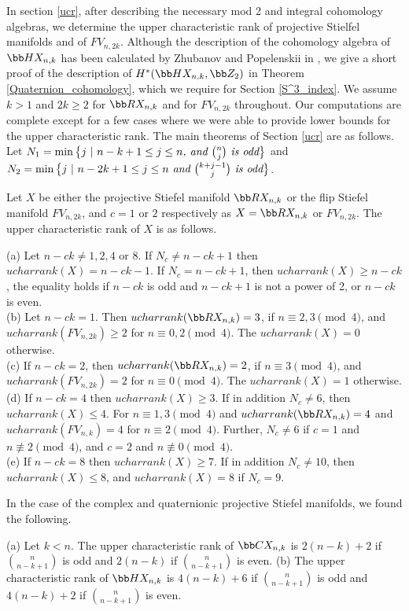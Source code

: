 In section \ref{ucr}, after describing the necessary mod 2 and integral cohomology algebras, we determine the upper characteristic rank of projective Stielfel manifolds and of $FV_{n, 2k}$. Although the description of the cohomology algebra of $\bb HX_{n, k}$ has been calculated by Zhubanov and Popelenskii in \cite{Zhu-Pop2022}, we give a short proof of the description of $H^*(\bb HX_{n,k}, \bb Z_2)$ in Theorem \ref{Quaternion_cohomology}, which we require for Section \ref{S^3_index}. We assume $k>1$ and $2k\geq 2$ for $\bb RX_{n,k}$ and for $FV_{n, 2k}$ throughout. Our computations are complete except for a few cases where we were able to provide lower bounds for the upper characteristic rank. The main theorems of Section \ref{ucr} are as follows. Let $N_1=\min\big{\{}j~|~n-k+1\leq j\leq n \textit{, and $\binom{n}{j}$ is odd}\big{\}}$ and $N_2= \min\big{\{}j~|~n-2k+1\leq j\leq n \textit{ and $\binom{k+j-1}{j}$ is odd}\big{\}}$.
\begin{Theorem}\label{main1}
    Let $X$ be either the projective Stiefel manifold $\bb RX_{n, k}$ or the flip Stiefel manifold $FV_{n, 2k}$, and $c=1$ or $2$ respectively as $X=\bb RX_{n, k}$ or $FV_{n, 2k}$. The upper characteristic rank of $X$ is as follows.
    
          (a) Let $n - ck\neq 1,2,4$ or $8$. If $N_c\neq n-ck+1$ then $ucharrank(X)= n-ck-1$. If $N_c=n-ck+1$, then $ucharrank(X)\geq n-ck$, the equality holds if $n-ck$ is odd and $n-ck+1$ is not a power of 2, or $n-ck$ is even. \\
          (b) Let $n - ck = 1$. Then $ucharrank(\bb RX_{n,k})=3$, if $n\equiv 2, 3\pmod 4$, and $ucharrank(FV_{n, 2k})\geq 2$ for $n\equiv 0,2\pmod 4$. The $ucharrank(X)= 0$ otherwise. \\
          (c) If $n-ck = 2$, then $ucharrank(\bb RX_{n,k})=2$, if $n\equiv 3\pmod 4$, and $ucharrank(FV_{n, 2k})= 2$ for $n\equiv 0\pmod 4$. The $ucharrank(X)= 1$ otherwise. \\
          (d) If $n-ck = 4$ then $ucharrank(X)\geq 3$. If in addition $N_c\neq 6$, then $ucharrank(X)\leq 4$. For $n\equiv 1,3\pmod 4$ and $ucharrank(\bb RX_{n, k}) =4$ and $ucharrank(FV_{n, k}) =4$ for $n\equiv2\pmod 4$. Further, $N_c\neq6$ if $c=1$ and $n\not\equiv2\pmod4$, and $c=2$ and $n\not\equiv 0\pmod 4$.\\
          (e) If $n-ck=8$ then $ucharrank(X)\geq 7$.  If in addition $N_c\neq 10$, then $ucharrank(X)\leq 8$, and $ucharrank(X)=8$ if $N_c=9$.
    \end{Theorem}
    In the case of the complex and quaternionic projective Stiefel manifolds, we found the following.
\begin{Theorem}\label{main2}
    (a) Let $k<n$. The upper characteristic rank of $\bb CX_{n,k}$ is $2(n-k)+2$ if $\binom{n}{n-k+1}$ is odd and $2(n-k)$ if $\binom{n}{n-k+1}$ is even.
    (b) The upper characteristic rank of $\bb HX_{n,k}$ is $4(n-k)+6$ if $\binom{n}{n-k+1}$ is odd and $4(n-k)+2$ if $\binom{n}{n-k+1}$ is even. 
\end{Theorem}

